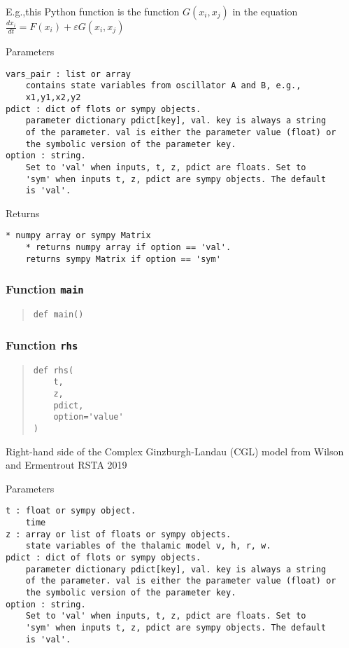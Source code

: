 \documentclass[english,a4paper,oneside]{article}
\begin{document}
E.g.,this Python function is the function \(G(x_i,x_j)\) in the equation
\(\frac{dx_i}{dt} = F(x_i) + \varepsilon G(x_i,x_j)\)

Parameters

\begin{verbatim}
vars_pair : list or array
    contains state variables from oscillator A and B, e.g.,
    x1,y1,x2,y2
pdict : dict of flots or sympy objects.
    parameter dictionary pdict[key], val. key is always a string
    of the parameter. val is either the parameter value (float) or 
    the symbolic version of the parameter key.
option : string.
    Set to 'val' when inputs, t, z, pdict are floats. Set to
    'sym' when inputs t, z, pdict are sympy objects. The default
    is 'val'.
\end{verbatim}

Returns

\begin{verbatim}
* numpy array or sympy Matrix
    * returns numpy array if option == 'val'. 
    returns sympy Matrix if option == 'sym'
\end{verbatim}

\hypertarget{CGL.main}{%
\subsubsection{\texorpdfstring{Function
\texttt{main}}{Function main}}\label{CGL.main}}

\begin{quote}
\begin{verbatim}
def main()
\end{verbatim}
\end{quote}

\hypertarget{CGL.rhs}{%
\subsubsection{\texorpdfstring{Function
\texttt{rhs}}{Function rhs}}\label{CGL.rhs}}

\begin{quote}
\begin{verbatim}
def rhs(
    t,
    z,
    pdict,
    option='value'
)
\end{verbatim}
\end{quote}

Right-hand side of the Complex Ginzburgh-Landau (CGL) model from Wilson
and Ermentrout RSTA 2019

Parameters

\begin{verbatim}
t : float or sympy object.
    time
z : array or list of floats or sympy objects.
    state variables of the thalamic model v, h, r, w.
pdict : dict of flots or sympy objects.
    parameter dictionary pdict[key], val. key is always a string
    of the parameter. val is either the parameter value (float) or 
    the symbolic version of the parameter key.
option : string.
    Set to 'val' when inputs, t, z, pdict are floats. Set to
    'sym' when inputs t, z, pdict are sympy objects. The default
    is 'val'.
\end{verbatim}
\end{document}
